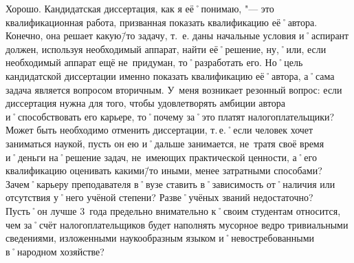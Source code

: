\begin{drama}
	\maxspeaks Хорошо. Кандидатская диссертация, как я её˚понимаю, "--- это квалификационная работа, призванная показать квалификацию её˚автора. Конечно, она решает какую\=/то задачу, т.~е. даны начальные условия и˚аспирант должен, используя необходимый аппарат, найти её˚решение, ну,˚или, если необходимый аппарат ещё не~придуман, то˚разработать его. Но˚цель кандидатской диссертации именно показать квалификацию её˚автора, а˚сама задача является вопросом вторичным. У~меня возникает резонный вопрос: если диссертация нужна для того, чтобы удовлетворять амбиции автора и˚способствовать его карьере, то˚почему за˚это платят налогоплательщики? Может быть необходимо отменить диссертации, т.\,е.˚если человек хочет заниматься наукой, пусть он ею и˚дальше занимается, не~тратя своё время и˚деньги на˚решение задач, не~имеющих практической ценности, а˚его квалификацию оценивать какими\=/то иными, менее затратными способами? Зачем˚карьеру преподавателя в˚вузе ставить в˚зависимость от˚наличия или отсутствия у˚него учёной степени? Разве˚учёных званий недостаточно? Пусть˚он лучше 3~года предельно внимательно к˚своим студентам относится, чем за˚счёт налогоплательщиков будет наполнять мусорное ведро тривиальными сведениями, изложенными наукообразным языком и˚невостребованными в˚народном хозяйстве?
	

\end{drama}
